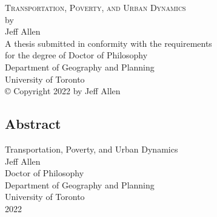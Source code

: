 \documentclass[11 pt, letterpaper]{report}
\begin{document}
	
{\begin{titlepage}
		\large
		\singlespacing
		\begin{center}
			\mbox{}
			\vfill
			\textsc{Transportation, Poverty, and Urban Dynamics}\\
			\vfill
			by \\
			\vfill
			{Jeff Allen}\\
			\vfill
			\vfill
			A thesis submitted in conformity with the requirements \\
			for the degree of Doctor of Philosophy  \\
			Department of Geography and Planning \\
			University of Toronto \\
			\vfill
			{\copyright} Copyright 2022 by Jeff Allen\\
			\vspace{.01\textheight}
			\mbox{}
		\end{center}
		\setcounter{page}{1}
	\end{titlepage}
	\setcounter{page}{2}}






\renewcommand{\thepage}{\roman{page}}%

\newpage



\begin{center}
\section*{Abstract}
	\singlespacing
	{Transportation, Poverty, and Urban Dynamics}\\[2ex]
	{Jeff Allen}\\
	{Doctor of Philosophy}\\
	Department of Geography and Planning\\
	University of Toronto\\
	{2022}\\
\end{center}
\end{document}
